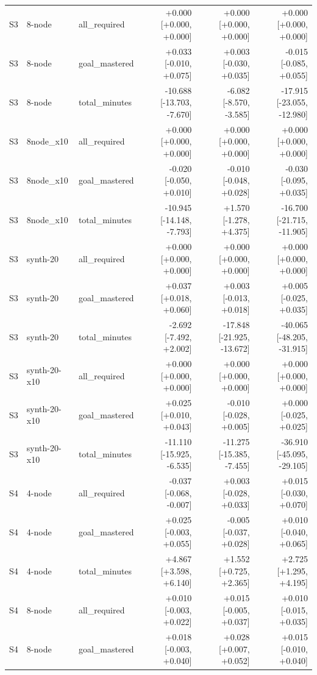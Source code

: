 \begin{table}[htbp]
\begin{tabular}{lllrrr}
S3 & 8-node & all\_required & +0.000 [+0.000, +0.000] & +0.000 [+0.000, +0.000] & +0.000 [+0.000, +0.000] \\
S3 & 8-node & goal\_mastered & +0.033 [-0.010, +0.075] & +0.003 [-0.030, +0.035] & -0.015 [-0.085, +0.055] \\
S3 & 8-node & total\_minutes & -10.688 [-13.703, -7.670] & -6.082 [-8.570, -3.585] & -17.915 [-23.055, -12.980] \\
S3 & 8node\_x10 & all\_required & +0.000 [+0.000, +0.000] & +0.000 [+0.000, +0.000] & +0.000 [+0.000, +0.000] \\
S3 & 8node\_x10 & goal\_mastered & -0.020 [-0.050, +0.010] & -0.010 [-0.048, +0.028] & -0.030 [-0.095, +0.035] \\
S3 & 8node\_x10 & total\_minutes & -10.945 [-14.148, -7.793] & +1.570 [-1.278, +4.375] & -16.700 [-21.715, -11.905] \\
S3 & synth-20 & all\_required & +0.000 [+0.000, +0.000] & +0.000 [+0.000, +0.000] & +0.000 [+0.000, +0.000] \\
S3 & synth-20 & goal\_mastered & +0.037 [+0.018, +0.060] & +0.003 [-0.013, +0.018] & +0.005 [-0.025, +0.035] \\
S3 & synth-20 & total\_minutes & -2.692 [-7.492, +2.002] & -17.848 [-21.925, -13.672] & -40.065 [-48.205, -31.915] \\
S3 & synth-20-x10 & all\_required & +0.000 [+0.000, +0.000] & +0.000 [+0.000, +0.000] & +0.000 [+0.000, +0.000] \\
S3 & synth-20-x10 & goal\_mastered & +0.025 [+0.010, +0.043] & -0.010 [-0.028, +0.005] & +0.000 [-0.025, +0.025] \\
S3 & synth-20-x10 & total\_minutes & -11.110 [-15.925, -6.535] & -11.275 [-15.385, -7.455] & -36.910 [-45.095, -29.105] \\
S4 & 4-node & all\_required & -0.037 [-0.068, -0.007] & +0.003 [-0.028, +0.033] & +0.015 [-0.030, +0.070] \\
S4 & 4-node & goal\_mastered & +0.025 [-0.003, +0.055] & -0.005 [-0.037, +0.028] & +0.010 [-0.040, +0.065] \\
S4 & 4-node & total\_minutes & +4.867 [+3.598, +6.140] & +1.552 [+0.725, +2.365] & +2.725 [+1.295, +4.195] \\
S4 & 8-node & all\_required & +0.010 [-0.003, +0.022] & +0.015 [-0.005, +0.037] & +0.010 [-0.015, +0.035] \\
S4 & 8-node & goal\_mastered & +0.018 [-0.003, +0.040] & +0.028 [+0.007, +0.052] & +0.015 [-0.010, +0.040] \\

\end{tabular}
\end{table}
